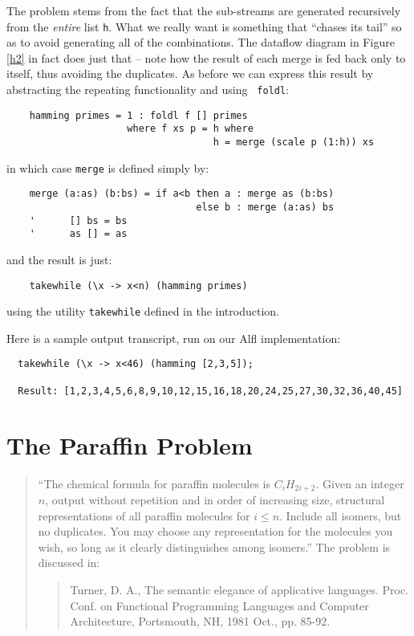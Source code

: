 The problem stems from the fact that the sub-streams are generated
recursively from the {\em entire} list {\tt h}.  What we really want
is something that ``chases its tail'' so as to avoid generating all of
the combinations.  The dataflow diagram in Figure \ref{h2} in fact
does just that -- note how the result of each merge is fed back only
to itself, thus avoiding the duplicates.  As before we can express
this result by abstracting the repeating functionality and using {\tt
foldl}:
\begin{verbatim}
    hamming primes = 1 : foldl f [] primes
                     where f xs p = h where
                                    h = merge (scale p (1:h)) xs
\end{verbatim}
in which case {\tt merge} is defined simply by:
\begin{verbatim}
    merge (a:as) (b:bs) = if a<b then a : merge as (b:bs)
                                 else b : merge (a:as) bs
    '      [] bs = bs
    '      as [] = as
\end{verbatim}
and the result is just:
\begin{verbatim}
    takewhile (\x -> x<n) (hamming primes)
\end{verbatim}
using the utility {\tt takewhile} defined in the introduction.

Here is a sample output transcript, run on our Alfl implementation:
\begin{verbatim}
  takewhile (\x -> x<46) (hamming [2,3,5]);

  Result: [1,2,3,4,5,6,8,9,10,12,15,16,18,20,24,25,27,30,32,36,40,45]
\end{verbatim}

\section{The Paraffin Problem}

\begin{quotation}
``The chemical formula for paraffin molecules is $C_iH_{2i+2}$.  Given
an integer $n$, output without repetition and in order of increasing
size, structural representations of all paraffin molecules for $i \leq
n$.  Include all isomers, but no duplicates.  You may choose any
representation for the molecules you wish, so long as it clearly
distinguishes among isomers.''  The problem is discussed in:
\begin{quotation}
Turner, D. A., The semantic elegance of  applicative  languages.
Proc. Conf. on Functional Programming Languages and Computer Architecture, 
Portsmouth, NH, 1981 Oct., pp. 85-92.
\end{quotation}
\end{quotation}

